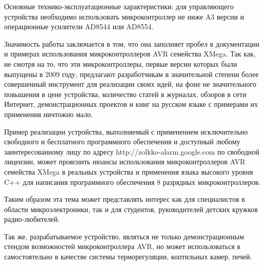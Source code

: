 Основные технико-эксплуатационные характеристики: для управляющего устройства необходимо использовать
микроконтроллер не ниже A3 версии и операционные усилители AD8544 или AD8554.


\begin{par}
Значимость работы заключается в том, что она заполняет пробел в документации и примерах использования
микроконтроллеров AVR семейства XMega. Так как, не смотря на то, что эти микроконтроллеры, первые версии
которых были выпущены в 2009 году, предлагают разработчикам в значительной степени более совершенный
инструмент для реализации своих идей, на фоне не значительного повышения в цене устройства, количество
статей в журналах, обзоров в сети Интернет, демонстрационных проектов и книг на русском языке с
примерами их применения ничтожно мало.
\end{par}

\begin{par}
Пример реализации устройства, выполняемый с применением исключительно свободного и бесплатного
программного обеспечения и доступный любому заинтересованному лицу по адресу http://zolkko-alarm.google.com
по свободной лицензии, может прояснить нюансы использования микроконтроллеров AVR семейства
XMega в реальных устройства и применения языка высокого уровня C++ для написания программного
обеспечения 8 разрядных микроконтроллеров.
\end{par}

\begin{par}
Таким образом эта тема может представлять интерес как для специалистов в области микроэлектроники,
так и для студентов, руководителей детских кружков радио-любителей.
\end{par}

\begin{par}
Так же, разрабатываемое устройство, являться не только демонстрационным стендом возможностей микроконтроллера AVR,
но может использоваться в самостоятельно в качестве системы терморегуляции, коптильных камер, печей.
\end{par}
\newpage{}










